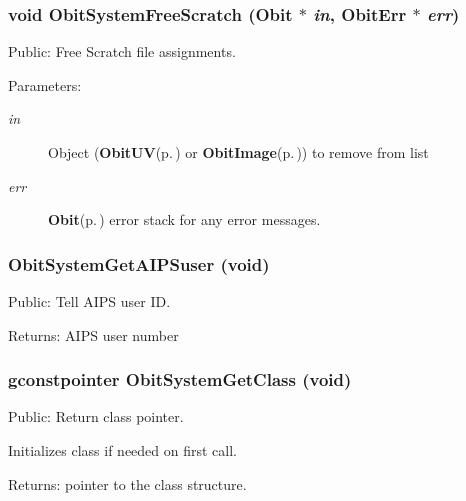 \subsubsection{\setlength{\rightskip}{0pt plus 5cm}void Obit\-System\-Free\-Scratch ({\bf Obit} $\ast$ {\em in}, {\bf Obit\-Err} $\ast$ {\em err})}\label{ObitSystem_8c_a19}


Public: Free Scratch file assignments. 

\begin{Desc}
\item[Parameters:]
\begin{description}
\item[{\em in}]Object ({\bf Obit\-UV}{\rm (p.\,\pageref{structObitUV})} or {\bf Obit\-Image}{\rm (p.\,\pageref{structObitImage})}) to remove from list \item[{\em err}]{\bf Obit}{\rm (p.\,\pageref{structObit})} error stack for any error messages. \end{description}
\end{Desc}
\subsubsection{ Obit\-System\-Get\-AIPSuser (void)}\label{ObitSystem_8c_a25}


Public: Tell AIPS user ID. 

\begin{Desc}
\item[Returns:]AIPS user number \end{Desc}
\subsubsection{\setlength{\rightskip}{0pt plus 5cm}gconstpointer Obit\-System\-Get\-Class (void)}\label{ObitSystem_8c_a15}


Public: Return class pointer. 

Initializes class if needed on first call. \begin{Desc}
\item[Returns:]pointer to the class structure. \end{Desc}
